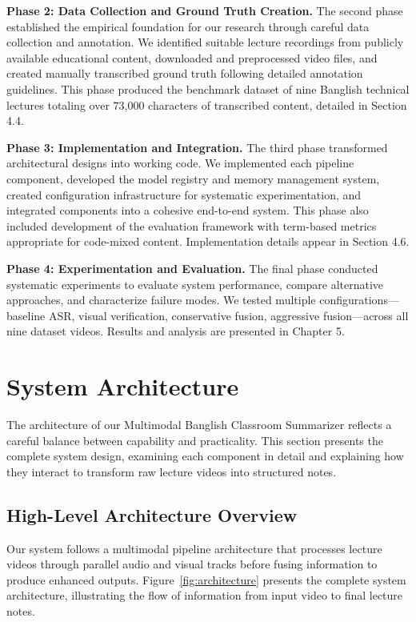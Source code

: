 \textbf{Phase 2: Data Collection and Ground Truth Creation.} The second phase established the empirical foundation for our research through careful data collection and annotation. We identified suitable lecture recordings from publicly available educational content, downloaded and preprocessed video files, and created manually transcribed ground truth following detailed annotation guidelines. This phase produced the benchmark dataset of nine Banglish technical lectures totaling over 73,000 characters of transcribed content, detailed in Section 4.4.

\textbf{Phase 3: Implementation and Integration.} The third phase transformed architectural designs into working code. We implemented each pipeline component, developed the model registry and memory management system, created configuration infrastructure for systematic experimentation, and integrated components into a cohesive end-to-end system. This phase also included development of the evaluation framework with term-based metrics appropriate for code-mixed content. Implementation details appear in Section 4.6.

\textbf{Phase 4: Experimentation and Evaluation.} The final phase conducted systematic experiments to evaluate system performance, compare alternative approaches, and characterize failure modes. We tested multiple configurations---baseline ASR, visual verification, conservative fusion, aggressive fusion---across all nine dataset videos. Results and analysis are presented in Chapter 5.

\section{System Architecture}

The architecture of our Multimodal Banglish Classroom Summarizer reflects a careful balance between capability and practicality. This section presents the complete system design, examining each component in detail and explaining how they interact to transform raw lecture videos into structured notes.

\subsection{High-Level Architecture Overview}

Our system follows a multimodal pipeline architecture that processes lecture videos through parallel audio and visual tracks before fusing information to produce enhanced outputs. Figure~\ref{fig:architecture} presents the complete system architecture, illustrating the flow of information from input video to final lecture notes.

